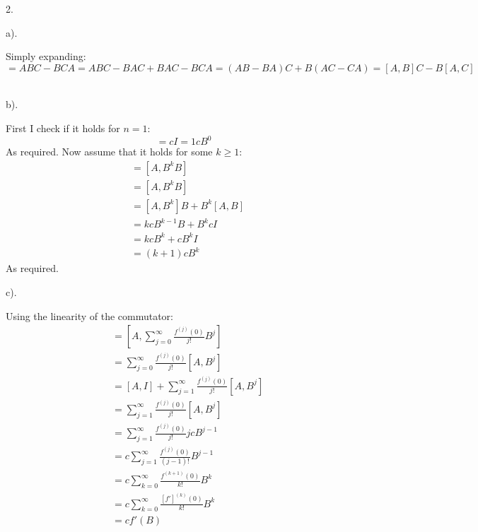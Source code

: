 \documentclass[a4paper,12pt]{article}
\begin{document}
2.
\begin{minipage}[t]{0.9\textwidth}
  a).
  \begin{minipage}[t]{\textwidth}
    Simply expanding:
    \begin{equation*}
      [A, BC] = ABC - BCA = ABC - BAC + BAC - BCA = (AB - BA)C + B(AC - CA) = [A,B]C - B[A, C]
    \end{equation*}\\
  \end{minipage}

  b).
  \begin{minipage}[t]{\textwidth}
    First I check if it holds for $n = 1$:
    \begin{equation*}
      [A, B] =  cI = 1cB^0
    \end{equation*}
    As required.
    Now assume that it holds for some $k \geq 1$:
    \begin{align*}
      [A, B^{k +1}] &= [A, B^{k} B]\\
                    &= [A, B^{k} B]\\
                    &= [A, B^{k}]B + B^k[A, B]\\
                    &= k c B^{k - 1}B + B^k c I\\
                    &= k c B^{k} + c B^k I\\
                    &= (k + 1) c B^{k}
    \end{align*}
    As required.\\
  \end{minipage}

  c).
  \begin{minipage}[t]{\textwidth}
    Using the linearity of the commutator:
    \begin{align*}
      [A, f(B)] &= [A, \sum_{j = 0}^{\infty}\frac{f^{(j)}(0)}{j!} B^j]\\
                &= \sum_{j = 0}^{\infty}\frac{f^{(j)}(0)}{j!} [A, B^j]\\
                &= [A, I] + \sum_{j = 1}^{\infty}\frac{f^{(j)}(0)}{j!} [A, B^j]\\
                &= \sum_{j = 1}^{\infty}\frac{f^{(j)}(0)}{j!} [A, B^j]\\
                &= \sum_{j = 1}^{\infty}\frac{f^{(j)}(0)}{j!} j c B^{j - 1}\\
                &= c \sum_{j = 1}^{\infty}\frac{f^{(j)}(0)}{(j-1)!} B^{j - 1}\\
                &= c \sum_{k = 0}^{\infty}\frac{f^{(k + 1)}(0)}{k!} B^{k}\\
                &= c \sum_{k = 0}^{\infty}\frac{[f']^{(k)}(0)}{k!} B^{k}\\
                &= c f'(B)
    \end{align*}
  \end{minipage}
\end{minipage}
\end{document}
